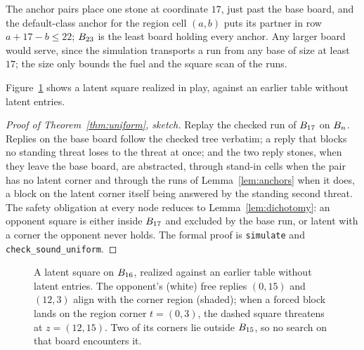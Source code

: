 \documentclass[11pt]{amsart}
\theoremstyle{definition}
\theoremstyle{remark}
\begin{document}
The anchor pairs place one stone at coordinate $17$, just past the
base board, and the default-class anchor for the region cell $(a,b)$
puts its partner in row $a + 17 - b \le 22$; $B_{23}$ is the
least board holding every anchor. Any larger board would serve, since
the simulation transports a run from any base of size at least $17$;
the size only bounds the fuel and the square scan of the runs.

Figure~\ref{fig:farm} shows a latent square realized in play,
against an earlier table without latent entries.

\begin{proof}[Proof of Theorem~\ref{thm:uniform}, sketch]
Replay the checked run of $B_{17}$ on $B_n$. Replies on
the base board follow the checked tree verbatim; a reply that blocks
no standing threat loses to the threat at once; and the two reply
stones, when they leave the base board, are abstracted, through
stand-in cells when the pair has no latent corner and through the
runs of Lemma~\ref{lem:anchors} when it does, a block on the latent
corner itself being answered by the standing second threat. The
safety obligation at every node reduces to
Lemma~\ref{lem:dichotomy}: an opponent square is either inside
$B_{17}$ and excluded by the base run, or latent with a corner
the opponent never holds. The formal proof is \texttt{simulate} and
\texttt{check\_sound\_uniform}.
\end{proof}

\begin{figure}[ht]
\centering
{}
\caption{A latent square on $B_{16}$, realized against an
earlier table without latent entries. The opponent's (white) free
replies $(0,15)$ and $(12,3)$ align with the corner region (shaded);
when a forced block lands on the region corner $t = (0,3)$, the
dashed square threatens at $z = (12,15)$. Two of its corners lie
outside $B_{15}$, so no search on that board encounters it.}
\label{fig:farm}
\end{figure}
\end{document}
